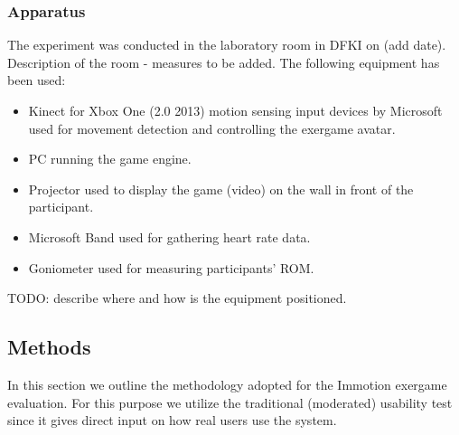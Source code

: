 \subsubsection{Apparatus}
The experiment was conducted in the laboratory room in DFKI on (add date). Description of the room - measures to be added. The following equipment has been used:
\begin{itemize}
\item Kinect for Xbox One (2.0 2013) motion sensing input devices by Microsoft used for movement detection and controlling the exergame avatar. 
\item PC running the game engine.
\item Projector used to display the game (video) on the wall in front of the participant.
\item Microsoft Band used for gathering heart rate data.
\item Goniometer used for measuring participants' ROM.
\end{itemize}
TODO: describe where and how is the equipment positioned.

\subsection{Methods} 
In this section we outline the methodology adopted for the Immotion exergame evaluation. For this purpose we utilize the traditional (moderated) usability test since it gives direct input on how real users use the system. %
%
